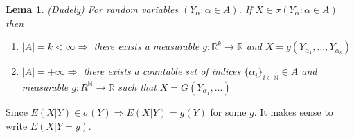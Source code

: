 \documentclass[12pt,a4paper]{amsart}
\theoremstyle{definition} %
\theoremstyle{plain} %
\newtheorem{lema}[defn]{Lema}
\newcommand{\R}{\mathbb R}
\newcommand{\N}{\mathbb N}
\begin{document}
\begin{lema} (Dudely)
For random variables $(Y_\alpha: \alpha \in A)$. If $X \in \sigma(Y_\alpha: \alpha \in A)$ then
\begin{enumerate}
\item $|A| = k < \infty \Rightarrow$ there exists a measurable $g: \R^k \rightarrow \R$ and $X = g(Y_{\alpha_1}, \dots, Y_{\alpha_k})$
\item $|A| = +\infty \Rightarrow$ there exists a countable set of indices $\{\alpha_i\}_{i \in \N} \in A$ and measurable
$g: R^\N \rightarrow \R$ such that $X = G(Y_{\alpha_1}, \dots)$
\end{enumerate}
\end{lema}

Since $E(X|Y) \in \sigma(Y) \Rightarrow E(X|Y) = g(Y)$ for some $g$. It makes sense to write $E(X | Y = y)$. 
\end{document}
